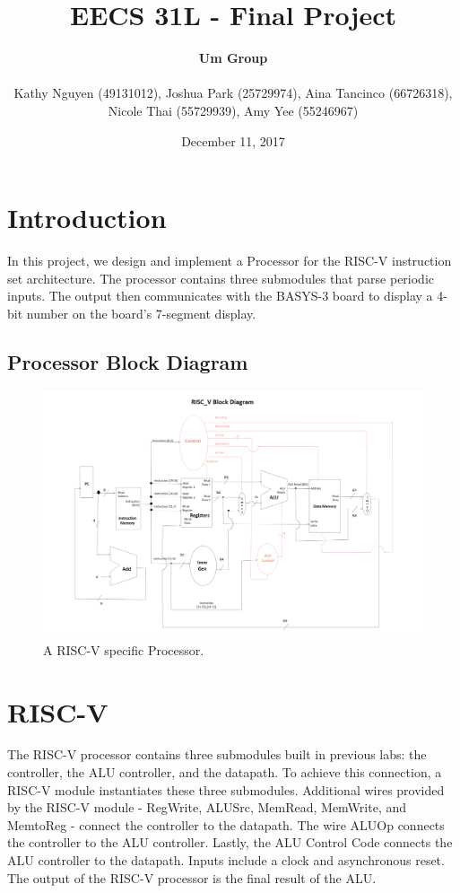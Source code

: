 \documentclass{article}
\title{EECS 31L - Final Project}
\author {
\textbf{Um Group}
\\
\\Kathy Nguyen (49131012), Joshua Park (25729974), Aina Tancinco (66726318), 
\\ Nicole Thai (55729939), Amy Yee (55246967)
} %
\date{December 11, 2017}
\begin{document}
\maketitle

\section{Introduction}
In this project, we design and implement a Processor for the RISC-V instruction set architecture. The processor contains three submodules that parse periodic inputs. The output then communicates with the BASYS-3 board to display a 4-bit number on the board's 7-segment display.

\subsection{Processor Block Diagram}
\begin{figure}[H]
  \centering
    \includegraphics[width=\textwidth]{RISC_V.png}
  \caption{A RISC-V specific Processor.}

\end{figure}

\section{RISC-V}
The RISC-V processor contains three submodules built in previous labs: the controller, the ALU controller, and the datapath. To achieve this connection, a RISC-V module instantiates these three submodules. Additional wires provided by the RISC-V module - RegWrite, ALUSrc, MemRead, MemWrite, and MemtoReg - connect the controller to the datapath.  The wire ALUOp connects the controller to the ALU controller. Lastly, the ALU Control Code connects the ALU controller to the datapath. Inputs include a clock and asynchronous reset. The output of the RISC-V processor is the final result of the ALU. \\
\end{document}
